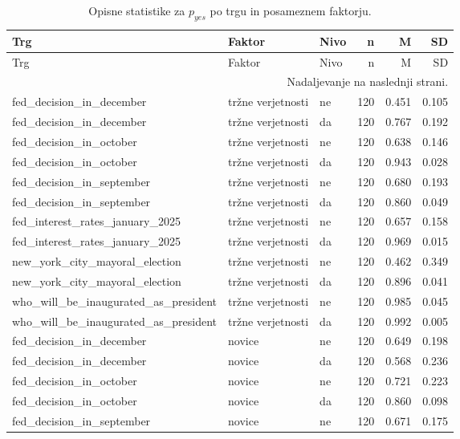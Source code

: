 \scriptsize
\setlength{\LTleft}{0pt}
\setlength{\LTright}{0pt}
\begin{longtable}{lllrrr}
\caption{Opisne statistike za $p_{yes}$ po trgu in posameznem faktorju.}\label{tab:summary-market-factor}\\
\toprule
Trg & Faktor & Nivo & n & M & SD \\
\midrule
\endfirsthead
\toprule
Trg & Faktor & Nivo & n & M & SD \\
\midrule
\endhead
\midrule
\multicolumn{6}{r}{Nadaljevanje na naslednji strani.} \\
\endfoot
\bottomrule
\endlastfoot
fed\_decision\_in\_december & tržne verjetnosti & ne & 120 & 0.451 & 0.105 \\
fed\_decision\_in\_december & tržne verjetnosti & da & 120 & 0.767 & 0.192 \\
fed\_decision\_in\_october & tržne verjetnosti & ne & 120 & 0.638 & 0.146 \\
fed\_decision\_in\_october & tržne verjetnosti & da & 120 & 0.943 & 0.028 \\
fed\_decision\_in\_september & tržne verjetnosti & ne & 120 & 0.680 & 0.193 \\
fed\_decision\_in\_september & tržne verjetnosti & da & 120 & 0.860 & 0.049 \\
fed\_interest\_rates\_january\_2025 & tržne verjetnosti & ne & 120 & 0.657 & 0.158 \\
fed\_interest\_rates\_january\_2025 & tržne verjetnosti & da & 120 & 0.969 & 0.015 \\
new\_york\_city\_mayoral\_election & tržne verjetnosti & ne & 120 & 0.462 & 0.349 \\
new\_york\_city\_mayoral\_election & tržne verjetnosti & da & 120 & 0.896 & 0.041 \\
who\_will\_be\_inaugurated\_as\_president & tržne verjetnosti & ne & 120 & 0.985 & 0.045 \\
who\_will\_be\_inaugurated\_as\_president & tržne verjetnosti & da & 120 & 0.992 & 0.005 \\
fed\_decision\_in\_december & novice & ne & 120 & 0.649 & 0.198 \\
fed\_decision\_in\_december & novice & da & 120 & 0.568 & 0.236 \\
fed\_decision\_in\_october & novice & ne & 120 & 0.721 & 0.223 \\
fed\_decision\_in\_october & novice & da & 120 & 0.860 & 0.098 \\
fed\_decision\_in\_september & novice & ne & 120 & 0.671 & 0.175 \\

\end{longtable}

